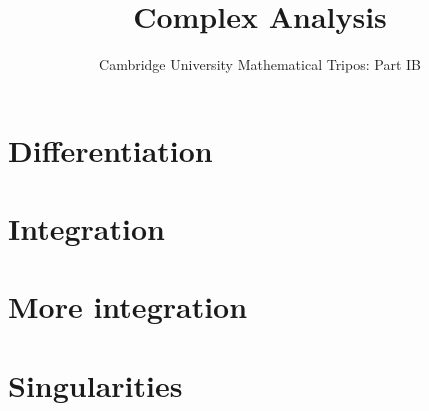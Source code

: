 \documentclass{article}
\title{Complex Analysis}
\author{Cambridge University Mathematical Tripos: Part IB}
\begin{document}
\maketitle

\tableofcontentsnewpage{}

\section{Differentiation}

\section{Integration}

\section{More integration}

\section{Singularities}

\end{document}
